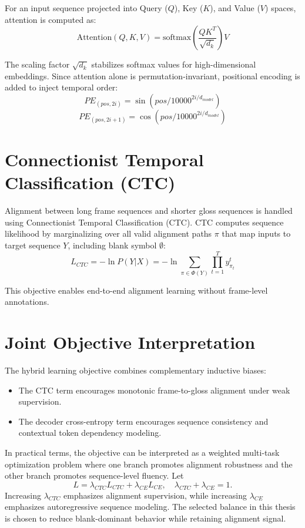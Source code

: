 For an input sequence projected into Query ($Q$), Key ($K$), and Value ($V$) spaces, attention is computed as:
\begin{equation}
\text{Attention}(Q, K, V) = \text{softmax}\left(\frac{QK^T}{\sqrt{d_k}}\right)V
\end{equation}

The scaling factor $\sqrt{d_k}$ stabilizes softmax values for high-dimensional embeddings. Since attention alone is permutation-invariant, positional encoding is added to inject temporal order:
\begin{equation}
PE_{(pos, 2i)} = \sin(pos / 10000^{2i/d_{model}})
\end{equation}
\begin{equation}
PE_{(pos, 2i+1)} = \cos(pos / 10000^{2i/d_{model}})
\end{equation}

\section{Connectionist Temporal Classification (CTC)}

Alignment between long frame sequences and shorter gloss sequences is handled using Connectionist Temporal Classification (CTC). CTC computes sequence likelihood by marginalizing over all valid alignment paths $\pi$ that map inputs to target sequence $Y$, including blank symbol $\emptyset$:
\begin{equation}
L_{CTC} = -\ln P(Y|X) = -\ln \sum_{\pi \in \Phi(Y)} \prod_{t=1}^{T} y_{\pi_t}^t
\end{equation}

This objective enables end-to-end alignment learning without frame-level annotations.

\section{Joint Objective Interpretation}

The hybrid learning objective combines complementary inductive biases:
\begin{itemize}
    \item The CTC term encourages monotonic frame-to-gloss alignment under weak supervision.
    \item The decoder cross-entropy term encourages sequence consistency and contextual token dependency modeling.
\end{itemize}

In practical terms, the objective can be interpreted as a weighted multi-task optimization problem where one branch promotes alignment robustness and the other branch promotes sequence-level fluency. Let
\begin{equation}
L = \lambda_{CTC}L_{CTC} + \lambda_{CE}L_{CE}, \quad \lambda_{CTC}+\lambda_{CE}=1.
\end{equation}
Increasing $\lambda_{CTC}$ emphasizes alignment supervision, while increasing $\lambda_{CE}$ emphasizes autoregressive sequence modeling. The selected balance in this thesis is chosen to reduce blank-dominant behavior while retaining alignment signal.

